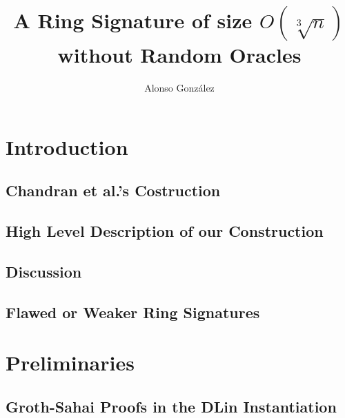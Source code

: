 \documentclass{llncs}
\author{Alonso Gonz\'alez}
\institute
{
	Ecole Normale Sup´\'erieure de Lyon, Laboratoire LIP (France)\\
	\email{alonso.gonzalez@ens-lyon.fr}
}
\title{A Ring Signature of size $O(\sqrt[3]{n})$ without Random Oracles}
\begin{document}
\maketitle
\begin{abstract}
    
\end{abstract} 

\section{Introduction}
    
    
    \subsection{Chandran et al.'s Costruction}
	
          
    
    \subsection{High Level Description of our Construction}
        
        

    \subsection{Discussion}

    	
    
    \subsection{Flawed or Weaker Ring Signatures}\label{sec:rs-flawed}
    
         



\section{Preliminaries}

	
        
	\subsection{Groth-Sahai Proofs in the DLin Instantiation} \label{sec:gs-proofs}
        
            
\end{document}
